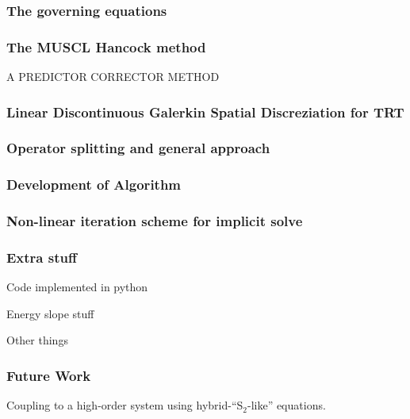 \documentclass[xcolor=dvipsnames]{beamer}
\begin{document}
\begin{frame}
    \frametitle{The governing equations}

    
\end{frame}


\begin{frame}
    \frametitle{The MUSCL Hancock method}
    A PREDICTOR CORRECTOR METHOD
\end{frame}

\begin{frame}
    \frametitle{Linear Discontinuous Galerkin Spatial Discreziation for TRT}

\end{frame}

\begin{frame}
    \frametitle{Operator splitting and general approach}
\end{frame}

\begin{frame}
    \frametitle{Development of Algorithm}


\end{frame}


\begin{frame}
    \frametitle{Non-linear iteration scheme for implicit solve} 


\end{frame}

\begin{frame}
    \frametitle{Extra stuff}
    Code implemented in python

    Energy slope stuff

    Other things


\end{frame}

\begin{frame}
    \frametitle{Future Work}

    Coupling to a high-order system using hybrid-``S$_2$-like'' equations.
\end{frame}
\end{document}
